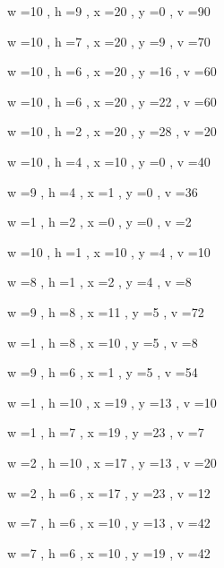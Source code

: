 \documentclass[11pt]{article}
\begin{document}
w =10 , h =9 , x =20 , y =0 , v =90
\par
w =10 , h =7 , x =20 , y =9 , v =70
\par
w =10 , h =6 , x =20 , y =16 , v =60
\par
w =10 , h =6 , x =20 , y =22 , v =60
\par
w =10 , h =2 , x =20 , y =28 , v =20
\par
w =10 , h =4 , x =10 , y =0 , v =40
\par
w =9 , h =4 , x =1 , y =0 , v =36
\par
w =1 , h =2 , x =0 , y =0 , v =2
\par
w =10 , h =1 , x =10 , y =4 , v =10
\par
w =8 , h =1 , x =2 , y =4 , v =8
\par
w =9 , h =8 , x =11 , y =5 , v =72
\par
w =1 , h =8 , x =10 , y =5 , v =8
\par
w =9 , h =6 , x =1 , y =5 , v =54
\par
w =1 , h =10 , x =19 , y =13 , v =10
\par
w =1 , h =7 , x =19 , y =23 , v =7
\par
w =2 , h =10 , x =17 , y =13 , v =20
\par
w =2 , h =6 , x =17 , y =23 , v =12
\par
w =7 , h =6 , x =10 , y =13 , v =42
\par
w =7 , h =6 , x =10 , y =19 , v =42
\par
\newpage
\end{document}
